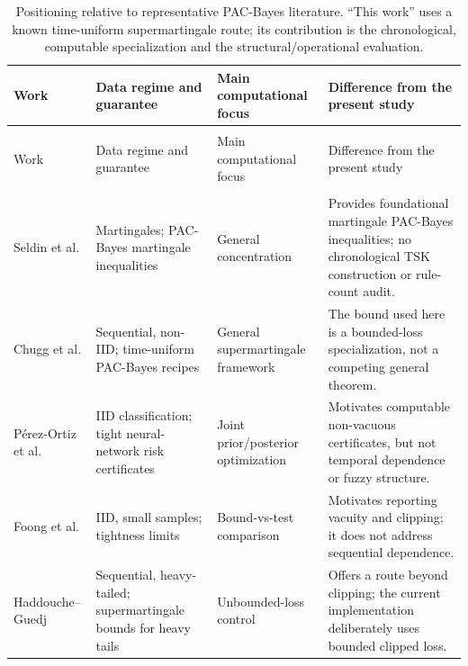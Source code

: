 \begingroup
\footnotesize
\setlength{\tabcolsep}{2pt}
\renewcommand{\arraystretch}{1.05}
\setlength{\LTleft}{0pt}
\setlength{\LTright}{0pt}
\setlength{\emergencystretch}{1em}
\begin{longtable}{
  >{\RaggedRight\arraybackslash}p{2.05cm}
  >{\RaggedRight\arraybackslash}p{3.35cm}
  >{\RaggedRight\arraybackslash}p{2.35cm}
  >{\RaggedRight\arraybackslash}p{5.05cm}
}
\caption{Positioning relative to representative PAC-Bayes literature. ``This work'' uses a known time-uniform supermartingale route; its contribution is the chronological, computable specialization and the structural/operational evaluation.}
\label{tab:prior_work}\\
\toprule
Work & Data regime and guarantee & Main computational focus & Difference from the present study \\
\midrule
\endfirsthead
\multicolumn{4}{c}{\tablename~\thetable\ (continued)}\\
\toprule
Work & Data regime and guarantee & Main computational focus & Difference from the present study \\
\midrule
\endhead
\midrule
\multicolumn{4}{r}{Continued on next page}\\
\endfoot
\bottomrule
\endlastfoot
Seldin et al. \cite{seldin2012martingales} & Martingales; PAC-Bayes martingale inequalities & General concentration & Provides foundational martingale PAC-Bayes inequalities; no chronological TSK construction or rule-count audit. \\
Chugg et al. \cite{chugg2023unified} & Sequential, non-IID; time-uniform PAC-Bayes recipes & General supermartingale framework & The bound used here is a bounded-loss specialization, not a competing general theorem. \\
P\'erez-Ortiz et al. \cite{perezortiz2021tighter} & IID classification; tight neural-network risk certificates & Joint prior/posterior optimization & Motivates computable non-vacuous certificates, but not temporal dependence or fuzzy structure. \\
Foong et al. \cite{foong2021small} & IID, small samples; tightness limits & Bound-vs-test comparison & Motivates reporting vacuity and clipping; it does not address sequential dependence. \\
Haddouche--Guedj \cite{haddouche2023heavy} & Sequential, heavy-tailed; supermartingale bounds for heavy tails & Unbounded-loss control & Offers a route beyond clipping; the current implementation deliberately uses bounded clipped loss. \\

\end{longtable}
